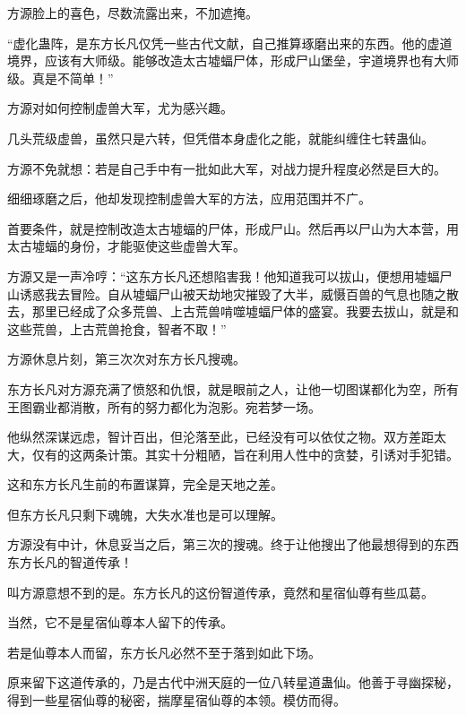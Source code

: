 
\begin{this_body}



方源脸上的喜色，尽数流露出来，不加遮掩。

“虚化蛊阵，是东方长凡仅凭一些古代文献，自己推算琢磨出来的东西。他的虚道境界，应该有大师级。能够改造太古墟蝠尸体，形成尸山堡垒，宇道境界也有大师级。真是不简单！”

方源对如何控制虚兽大军，尤为感兴趣。

几头荒级虚兽，虽然只是六转，但凭借本身虚化之能，就能纠缠住七转蛊仙。

方源不免就想：若是自己手中有一批如此大军，对战力提升程度必然是巨大的。

细细琢磨之后，他却发现控制虚兽大军的方法，应用范围并不广。

首要条件，就是控制改造太古墟蝠的尸体，形成尸山。然后再以尸山为大本营，用太古墟蝠的身份，才能驱使这些虚兽大军。

方源又是一声冷哼：“这东方长凡还想陷害我！他知道我可以拔山，便想用墟蝠尸山诱惑我去冒险。自从墟蝠尸山被天劫地灾摧毁了大半，威慑百兽的气息也随之散去，那里已经成了众多荒兽、上古荒兽啃噬墟蝠尸体的盛宴。我要去拔山，就是和这些荒兽，上古荒兽抢食，智者不取！”

方源休息片刻，第三次次对东方长凡搜魂。

东方长凡对方源充满了愤怒和仇恨，就是眼前之人，让他一切图谋都化为空，所有王图霸业都消散，所有的努力都化为泡影。宛若梦一场。

他纵然深谋远虑，智计百出，但沦落至此，已经没有可以依仗之物。双方差距太大，仅有的这两条计策。其实十分粗陋，旨在利用人性中的贪婪，引诱对手犯错。

这和东方长凡生前的布置谋算，完全是天地之差。

但东方长凡只剩下魂魄，大失水准也是可以理解。

方源没有中计，休息妥当之后，第三次的搜魂。终于让他搜出了他最想得到的东西东方长凡的智道传承！

叫方源意想不到的是。东方长凡的这份智道传承，竟然和星宿仙尊有些瓜葛。

当然，它不是星宿仙尊本人留下的传承。

若是仙尊本人而留，东方长凡必然不至于落到如此下场。

原来留下这道传承的，乃是古代中洲天庭的一位八转星道蛊仙。他善于寻幽探秘，得到一些星宿仙尊的秘密，揣摩星宿仙尊的本领。模仿而得。


\end{this_body}
